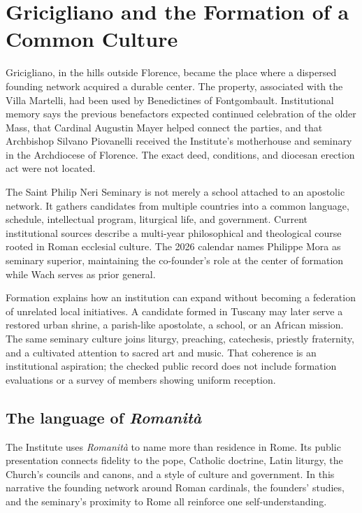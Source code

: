 \section{Gricigliano and the Formation of a Common Culture}

Gricigliano, in the hills outside Florence, became the place where a dispersed founding network acquired a durable center. The property, associated with the Villa Martelli, had been used by Benedictines of Fontgombault. Institutional memory says the previous benefactors expected continued celebration of the older Mass, that Cardinal Augustin Mayer helped connect the parties, and that Archbishop Silvano Piovanelli received the Institute's motherhouse and seminary in the Archdiocese of Florence. The exact deed, conditions, and diocesan erection act were not located.

The Saint Philip Neri Seminary is not merely a school attached to an apostolic network. It gathers candidates from multiple countries into a common language, schedule, intellectual program, liturgical life, and government. Current institutional sources describe a multi-year philosophical and theological course rooted in Roman ecclesial culture. The 2026 calendar names Philippe Mora as seminary superior, maintaining the co-founder's role at the center of formation while Wach serves as prior general.

Formation explains how an institution can expand without becoming a federation of unrelated local initiatives. A candidate formed in Tuscany may later serve a restored urban shrine, a parish-like apostolate, a school, or an African mission. The same seminary culture joins liturgy, preaching, catechesis, priestly fraternity, and a cultivated attention to sacred art and music. That coherence is an institutional aspiration; the checked public record does not include formation evaluations or a survey of members showing uniform reception.

\subsection{The language of \emph{Romanità}}

The Institute uses \emph{Romanità} to name more than residence in Rome. Its public presentation connects fidelity to the pope, Catholic doctrine, Latin liturgy, the Church's councils and canons, and a style of culture and government. In this narrative the founding network around Roman cardinals, the founders' studies, and the seminary's proximity to Rome all reinforce one self-understanding.

